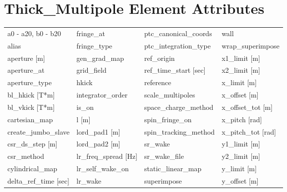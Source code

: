  \section{Thick_Multipole Element Attributes}
 \label{s:list.thick.multipole}
 
 \begin{tabular}{llll} \toprule
a0 - a20, b0 - b20               & fringe_at                        & ptc_canonical_coords             & wall                             \\
alias                            & fringe_type                      & ptc_integration_type             & wrap_superimpose                 \\
aperture [m]                     & gen_grad_map                     & ref_origin                       & x1_limit [m]                     \\
aperture_at                      & grid_field                       & ref_time_start [sec]             & x2_limit [m]                     \\
aperture_type                    & hkick                            & reference                        & x_limit [m]                      \\
bl_hkick [T*m]                   & integrator_order                 & scale_multipoles                 & x_offset [m]                     \\
bl_vkick [T*m]                   & is_on                            & space_charge_method              & x_offset_tot [m]                 \\
cartesian_map                    & l [m]                            & spin_fringe_on                   & x_pitch [rad]                    \\
create_jumbo_slave               & lord_pad1 [m]                    & spin_tracking_method             & x_pitch_tot [rad]                \\
csr_ds_step [m]                  & lord_pad2 [m]                    & sr_wake                          & y1_limit [m]                     \\
csr_method                       & lr_freq_spread [Hz]              & sr_wake_file                     & y2_limit [m]                     \\
cylindrical_map                  & lr_self_wake_on                  & static_linear_map                & y_limit [m]                      \\
delta_ref_time [sec]             & lr_wake                          & superimpose                      & y_offset [m]                     \\

\end{tabular}
